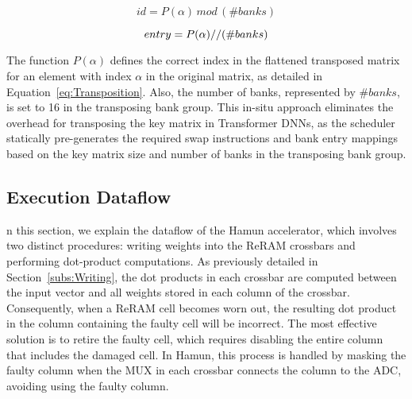 
\vskip -0.10in
\begin{equation}
    id = P(\alpha) \, mod \, (\#banks)
    \label{eq:id}
\end{equation}

\vskip -0.10in
\begin{equation}
    entry = P(\alpha) \///(\#banks)
    \label{eq:entry}
\end{equation}

The function $P(\alpha)$ defines the correct index in the flattened transposed matrix for an element with index $\alpha$ in the original matrix, as detailed in Equation~\ref{eq:Transposition}. Also, the number of banks, represented by $\#banks$, is set to 16 in the transposing bank group. This in-situ approach eliminates the overhead for transposing the key matrix in Transformer DNNs, as the scheduler statically pre-generates the required swap instructions and bank entry mappings based on the key matrix size and number of banks in the transposing bank group.

\subsection{Execution Dataflow}\label{subs:Execution Dataflow}
n this section, we explain the dataflow of the Hamun accelerator, which involves two distinct procedures: writing weights into the ReRAM crossbars and performing dot-product computations. As previously detailed in Section~\ref{subs:Writing}, the dot products in each crossbar are computed between the input vector and all weights stored in each column of the crossbar. Consequently, when a ReRAM cell becomes worn out, the resulting dot product in the column containing the faulty cell will be incorrect. The most effective solution is to retire the faulty cell, which requires disabling the entire column that includes the damaged cell. In Hamun, this process is handled by masking the faulty column when the MUX in each crossbar connects the column to the ADC, avoiding using the faulty column.



